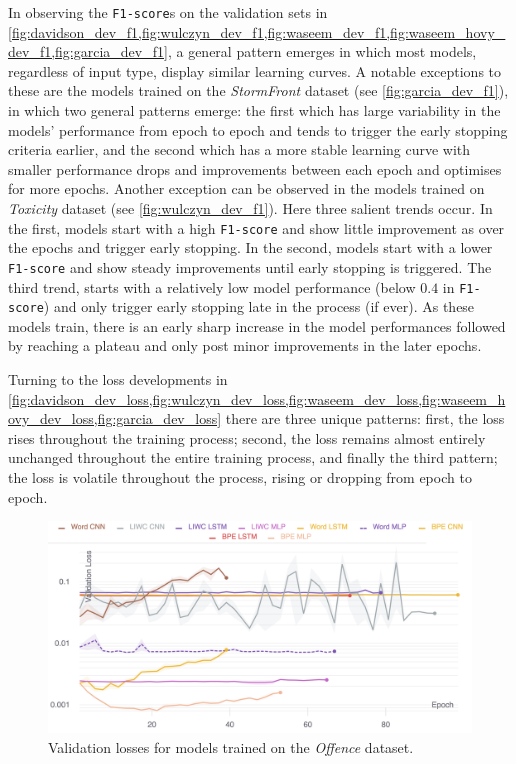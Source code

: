 In observing the \texttt{F1-score}s on the validation sets in \cref{fig:davidson_dev_f1,fig:wulczyn_dev_f1,fig:waseem_dev_f1,fig:waseem_hovy_dev_f1,fig:garcia_dev_f1}, a general pattern emerges in which most models, regardless of input type, display similar learning curves.
A notable exceptions to these are the models trained on the \textit{StormFront} dataset (see \cref{fig:garcia_dev_f1}), in which two general patterns emerge: the first which has large variability in the models' performance from epoch to epoch and tends to trigger the early stopping criteria earlier, and the second which has a more stable learning curve with smaller performance drops and improvements between each epoch and optimises for more epochs.
Another exception can be observed in the models trained on \textit{Toxicity} dataset (see \cref{fig:wulczyn_dev_f1}). Here three salient trends occur.
In the first, models start with a high \texttt{F1-score} and show little improvement as over the epochs and trigger early stopping.
In the second, models start with a lower \texttt{F1-score} and show steady improvements until early stopping is triggered.
The third trend, starts with a relatively low model performance (below $0.4$ in \texttt{F1-score}) and only trigger early stopping late in the process (if ever). As these models train, there is an early sharp increase in the model performances followed by reaching a plateau and only post minor improvements in the later epochs.

Turning to the loss developments in \cref{fig:davidson_dev_loss,fig:wulczyn_dev_loss,fig:waseem_dev_loss,fig:waseem_hovy_dev_loss,fig:garcia_dev_loss} there are three unique patterns: first, the loss rises throughout the training process; second, the loss remains almost entirely unchanged throughout the entire training process, and finally the third pattern; the loss is volatile throughout the process, rising or dropping from epoch to epoch.


\begin{figure}
    \centering
    \includegraphics[width=\textwidth]{davidson_dev_loss_stderr_logscale.pdf}
    \caption{Validation losses for models trained on the \textit{Offence} dataset.}
    \label{fig:davidson_dev_loss}
\end{figure}

